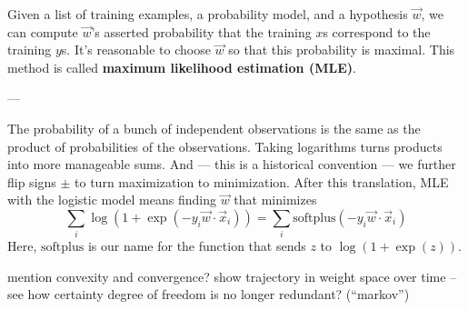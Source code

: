 \documentclass[11pt, justified]{tufte-book}
\newcommand{\attnsam}[1]{{\red \textsf{#1}}}
\newcommand{\sampassage}[1]{
   \vspace{0.1cm}
   \par\noindent{\hspace{-2cm}\normalsize \sc \gre #1} ---
}
\theoremstyle{definition}
\begin{document}
        Given a list of training examples, a probability model, and a
        hypothesis $\vec w$, we can compute $\vec w$'s asserted probability
        that the training $x$s correspond to the training $y$s.  It's
        reasonable to choose $\vec w$ so that this probability is maximal.
        This method is called \textbf{maximum likelihood estimation (MLE)}.


      \sampassage{logistic models} %

        The probability of a bunch of independent observations is the same as
        the product of probabilities of the observations.  Taking logarithms
        turns products into more manageable sums.  And --- this is a historical
        convention --- we further flip signs $\pm$ to turn maximization to 
        minimization.
        After this translation, MLE with the logistic model means finding $\vec
        w$ that minimizes
        $$
          \sum_i \log(1+\exp(-y_i\vec w\cdot \vec x_i))
          =
          \sum_i \text{softplus}(-y_i\vec w\cdot \vec x_i) 
        $$
        Here, $\text{softplus}$ is our name for the function that sends
        $z$ to $\log(1+\exp(z))$.


        \attnsam{mention convexity and convergence?}
        \attnsam{show trajectory in weight space over time -- see how certainty degree of freedom is no longer redundant? (``markov'')}

\end{document}
